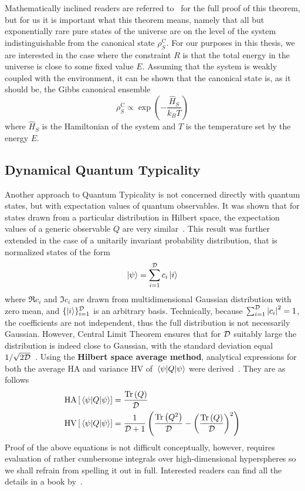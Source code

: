Mathematically inclined readers are
referred to~\textcite{Popescu2006a} for the full proof of this theorem, but for us it is important
what this theorem means, namely that all but exponentially rare pure states of the universe are on the level of the system
indistinguishable from the canonical state \(\rho_S^{\mathrm{C}}\).
For our purposes in this thesis, we are interested in the case where the constraint \(R\) is that the total energy
in the universe is close to some fixed value \(E\). Assuming that the system is weakly coupled with the environment, it
can be shown that the canonical state is, as it should be, the Gibbs canonical ensemble
\begin{equation}
	\rho_S^{\mathrm{C}} \propto \exp\left(-\frac{\hat{H} _S}{k_B T}\right)
\end{equation}
where \(\hat{H} _S\) is the Hamiltonian of the system and \(T\) is the temperature set by the energy \(E\).


\subsection{\label{sec:DQT} Dynamical Quantum Typicality}

Another approach to Quantum Typicality is not concerned directly with quantum states, but with
expectation values of quantum observables.
It was shown that for states drawn from a particular distribution in Hilbert space, the expectation
values of a generic observable \(Q\) are very similar~\autocite{Reimann2007}. This result was further extended
in the case of a unitarily invariant probability distribution, that is normalized states of the form
\begin{equation}
	\ket{\psi} = \sum_{i = 1}^{\mathcal{D}} c_i \ket{i}
\end{equation}
where \(\Re c_i\) and \(\Im c_i\) are drawn from multidimensional Gaussian distribution with zero mean,
and \(\{\ket{i}\}_{i=1}^{\mathcal{D}}\) is an arbitrary basis. Technically, because \(\sum_{i=1}^{\mathcal{D}}\abs{c_i}^2 = 1\),
the coefficients are not independent, thus the full distribution is not necessarily Gaussian. However,
Central Limit Theorem ensures that for \(\mathcal{D}\) suitably large the distribution is indeed close to Gaussian,
with the standard deviation equal \(1/\sqrt{2\mathcal{D}}\)~\autocite{Gemmer2009}.
Using the \textbf{Hilbert space average method}, analytical expressions
for both the average \(\mathrm{HA}\) and variance \(\mathrm{HV}\) of \(\matrixel{\psi}{Q}{\psi}\)
were derived~\autocite{Bartsch2009}. They are as follows
\begin{align}
	\mathrm{HA}\left[\matrixel{\psi}{Q}{\psi}\right] & = \frac{\Tr\left(Q\right)}{\dimension} \label{eq:HA} \\
	\mathrm{HV}\left[\matrixel{\psi}{Q}{\psi}\right] & = \frac{1}{\dimension + 1}\left(
	\frac{\Tr\left(Q^2\right)}{\dimension} - \left(\frac{\Tr\left(Q\right)}{\dimension}\right)^2
	\right)\label{eq:HV}
\end{align}
Proof of the above equations is not difficult conceptually, however, requires evaluation of rather
cumbersome integrals over high-dimensional hyperspheres so we shall refrain from spelling it out in full.
Interested readers can find all the details in a book by~\textcite{Gemmer2009}.

